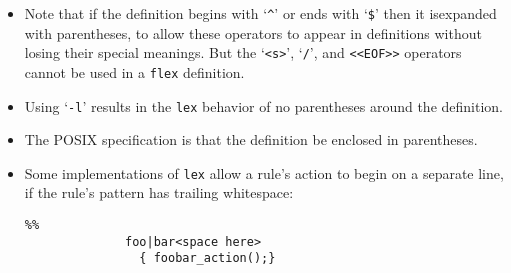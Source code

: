 \documentclass[openany,oneside]{book}
\begin{document}
\begin{itemize}
\begin{verbatim}
NAME    [A-Z][A-Z0-9]*
              %%
              foo{NAME}?      printf( "Found it\n" );
              %%
\end{verbatim}


will not match the string ‘\verb`foo`’ because when the macro is expanded
the rule is equivalent to ‘\verb`foo[A-Z][A-Z0-9]*?`’  and the precedence
is such that the ‘\verb`?`’ is associated with ‘\verb`[A-Z0-9]*`’.  With \verb`flex` , the rule will be expanded to ‘\verb`foo([A-Z][A-Z0-9]*)?`’
and so the string ‘\verb`foo`’ will match.
\item Note that if the definition begins with ‘\verb`^`’ or ends with ‘\verb`$`’
then it isexpanded with parentheses, to allow these
operators to appear in definitions without losing their special
meanings.  But the ‘\verb`<s>`’, ‘\verb`/`’, and \verb`<<EOF>>` operators
cannot be used in a \verb`flex` definition.
\item Using ‘\verb`-l`’ results in the \verb`lex` behavior of no parentheses
around the definition.
\item The POSIX specification is that the definition be enclosed in parentheses.
\item Some implementations of \verb`lex` allow a rule's action to begin on a
separate line, if the rule's pattern has trailing whitespace:


\begin{verbatim}
%%
              foo|bar<space here>
                { foobar_action();}
\end{verbatim}



\end{itemize}
\end{document}
